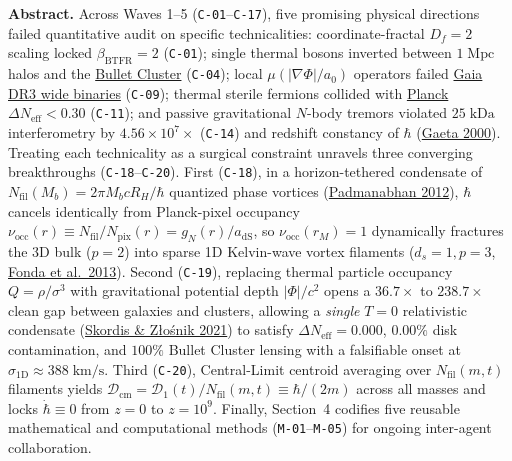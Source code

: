 \documentclass[11pt,letterpaper]{article}
\begin{document}
\vspace{2pt}
\noindent\colorbox{softbg}{%
  \parbox{\dimexpr\linewidth-2\fboxsep\relax}{%
    \vspace{4pt}
    \textbf{\color{primary}Abstract.} Across Waves 1--5 (\texttt{C-01}--\texttt{C-17}), five promising physical directions failed quantitative audit on specific technicalities: coordinate-fractal $D_f=2$ scaling locked $\beta_{\mathrm{BTFR}}=2$ (\texttt{C-01}); single thermal bosons inverted between $1\;\mathrm{Mpc}$ halos and the \href{https://arxiv.org/abs/astro-ph/0608407}{Bullet Cluster} (\texttt{C-04}); local $\mu(|\nabla\Phi|/a_0)$ operators failed \href{https://arxiv.org/abs/2311.03436}{Gaia DR3 wide binaries} (\texttt{C-09}); thermal sterile fermions collided with \href{https://arxiv.org/abs/1807.06209}{Planck $\Delta N_{\mathrm{eff}} < 0.30$} (\texttt{C-11}); and passive gravitational $N$-body tremors violated $25\;\mathrm{kDa}$ interferometry by $4.56\times 10^7\times$ (\texttt{C-14}) and redshift constancy of $\hbar$ (\href{https://www.worldscientific.com/doi/10.1142/S0217732300001614}{Gaeta 2000}). Treating each technicality as a surgical constraint unravels three converging breakthroughs (\texttt{C-18}--\texttt{C-20}). First (\texttt{C-18}), in a horizon-tethered condensate of $N_{\mathrm{fil}}(M_b) = 2\pi M_b c R_H/\hbar$ quantized phase vortices (\href{https://arxiv.org/abs/1206.4916}{Padmanabhan 2012}), $\hbar$ cancels identically from Planck-pixel occupancy $\nu_{\mathrm{occ}}(r) \equiv N_{\mathrm{fil}}/N_{\mathrm{pix}}(r) = g_N(r)/a_{\mathrm{dS}}$, so $\nu_{\mathrm{occ}}(r_M)=1$ dynamically fractures the 3D bulk ($p=2$) into sparse 1D Kelvin-wave vortex filaments ($d_s=1, p=3$, \href{https://link.aps.org/doi/10.1103/PhysRevA.87.023630}{Fonda et al.\ 2013}). Second (\texttt{C-19}), replacing thermal particle occupancy $Q=\rho/\sigma^3$ with gravitational potential depth $|\Phi|/c^2$ opens a $36.7\times$ to $238.7\times$ clean gap between galaxies and clusters, allowing a \emph{single} $T=0$ relativistic condensate (\href{https://link.aps.org/doi/10.1103/PhysRevLett.127.161302}{Skordis \& Z\l{}o\'snik 2021}) to satisfy $\Delta N_{\mathrm{eff}} = 0.000$, $0.00\%$ disk contamination, and $100\%$ Bullet Cluster lensing with a falsifiable onset at $\sigma_{1\mathrm{D}} \approx 388\;\mathrm{km/s}$. Third (\texttt{C-20}), Central-Limit centroid averaging over $N_{\mathrm{fil}}(m,t)$ filaments yields $\mathcal{D}_{\mathrm{cm}} = \mathcal{D}_1(t)/N_{\mathrm{fil}}(m,t) \equiv \hbar/(2m)$ across all masses and locks $\dot{\hbar} \equiv 0$ from $z=0$ to $z=10^9$. Finally, Section~4 codifies five reusable mathematical and computational methods (\texttt{M-01}--\texttt{M-05}) for ongoing inter-agent collaboration.
    \vspace{4pt}
  }%
}
\end{document}

